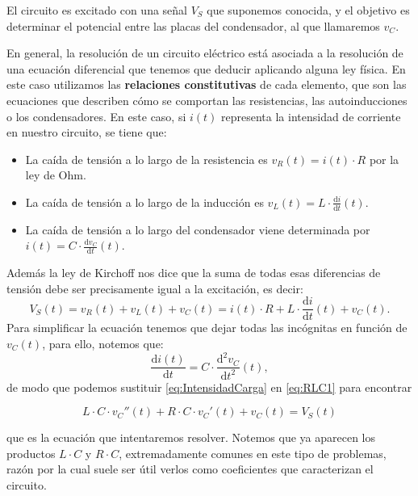 El circuito es excitado con una señal $V_S$ que suponemos conocida, y el objetivo es determinar el potencial entre las placas del condensador, al que llamaremos $v_C$.

En general, la resolución de un circuito eléctrico está asociada a la resolución de una ecuación diferencial que tenemos que deducir aplicando alguna ley física. En este caso utilizamos las \textbf{relaciones constitutivas} de cada elemento, que son las ecuaciones que describen cómo se comportan las resistencias, las autoinducciones o los condensadores. En este caso, si $i(t)$ representa la intensidad de corriente en nuestro circuito, se tiene que:

\begin{itemize}
\item La caída de tensión a lo largo de la resistencia es $v_R(t) = i(t) \cdot R$ por la ley de Ohm.
\item La caída de tensión a lo largo de la inducción es $v_L(t) = L\cdot \frac{\text{d} i}{\text{d}t}(t)$.
\item La caída de tensión a lo largo del condensador viene determinada por $i(t) = C\cdot \frac{\text{d}v_C}{\text{d}t}(t)$.
\end{itemize}

Además la ley de Kirchoff nos dice que la suma de todas esas diferencias de tensión debe ser precisamente igual a la excitación, es decir:
\begin{equation}
  \label{eq:RLC1}
  V_{S}(t) = v_{R}(t) + v_{L}(t) + v_{C}(t) = i(t)\cdot R + L\cdot \frac{\text{d}i}{\text{d}t}(t) + v_C(t).
\end{equation}
Para simplificar la ecuación tenemos que dejar todas las incógnitas en función de $v_C(t)$, para ello, notemos que:
\begin{equation}
  \label{eq:IntensidadCarga}
  \frac{\text{d}i(t)}{\text{d}t} = C\cdot \frac{\text{d}^2v_C}{\text{d}t^2}(t),
\end{equation}
de modo que podemos sustituir \eqref{eq:IntensidadCarga} en \eqref{eq:RLC1} para encontrar
\begin{mybox}\vspace{-5mm}
  \begin{equation}
    \label{eq:RLC}
    L\cdot C\cdot v_C''(t) + R\cdot C\cdot v_C'(t) + v_C(t) = V_S(t)
  \end{equation}
\end{mybox}
que es la ecuación que intentaremos resolver. Notemos que ya aparecen los productos $L\cdot C$ y $R\cdot C$, extremadamente comunes en este tipo de problemas, razón por la cual suele ser útil verlos como coeficientes que caracterizan el circuito.


